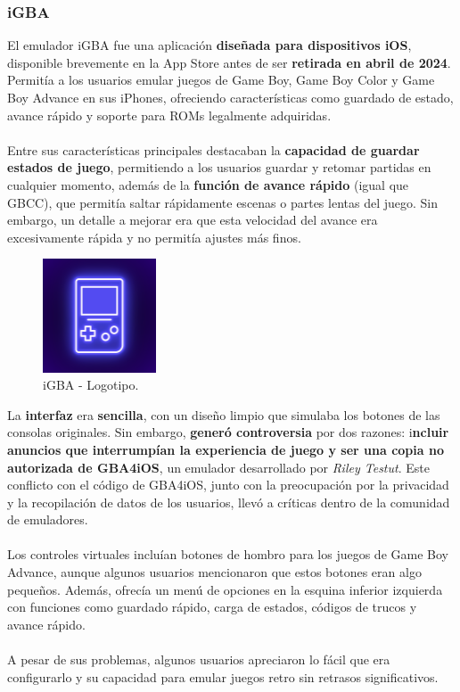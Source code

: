 \clearpage

\subsubsection{iGBA}

El emulador iGBA fue una aplicación \textbf{diseñada para dispositivos iOS}, disponible brevemente en la App Store antes de ser \textbf{retirada en abril de 2024}. Permitía a los usuarios emular juegos de Game Boy, Game Boy Color y Game Boy Advance en sus iPhones, ofreciendo características como guardado de estado, avance rápido y soporte para ROMs legalmente adquiridas.
\\\\
Entre sus características principales destacaban la \textbf{capacidad de guardar estados de juego}, permitiendo a los usuarios guardar y retomar partidas en cualquier momento, además de la \textbf{función de avance rápido} (igual que GBCC), que permitía saltar rápidamente escenas o partes lentas del juego. Sin embargo, un detalle a mejorar era que esta velocidad del avance era excesivamente rápida y no permitía ajustes más finos.

\begin{figure}[h]
    \centering
    \includegraphics[width=0.3\textwidth]{include/images/igbalogo.png}
    \caption{iGBA - Logotipo.}
    \label{figure:igbalogo}
\end{figure}

La \textbf{interfaz} era \textbf{sencilla}, con un diseño limpio que simulaba los botones de las consolas originales. Sin embargo, \textbf{generó controversia} por dos razones: i\textbf{ncluir anuncios que interrumpían la experiencia de juego y ser una copia no autorizada de GBA4iOS}, un emulador desarrollado por \textit{Riley Testut}. Este conflicto con el código de GBA4iOS, junto con la preocupación por la privacidad y la recopilación de datos de los usuarios, llevó a críticas dentro de la comunidad de emuladores​.
\\\\
Los controles virtuales incluían botones de hombro para los juegos de Game Boy Advance, aunque algunos usuarios mencionaron que estos botones eran algo pequeños. Además, ofrecía un menú de opciones en la esquina inferior izquierda con funciones como guardado rápido, carga de estados, códigos de trucos y avance rápido.
\\\\
A pesar de sus problemas, algunos usuarios apreciaron lo fácil que era configurarlo y su capacidad para emular juegos retro sin retrasos significativos.

